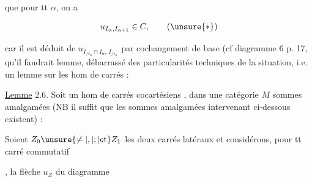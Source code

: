 
que pour tt $\alpha$,  on a

\[
 u_{I_\alpha,I_{\alpha+1}}\in C,\tag*{$(\unsure{*})$}
\]

car il est déduit de $u_{I_{/s_\alpha}\cap I_\alpha,\,I_{/s_\alpha}}$ par cochangement de base (cf diagramme 6 p. 17, qu'il faudrait   lemme, débarrassé des particularités techniques de la situation, i.e. un lemme sur les hom de carrés  :

\uline{Lemme} 2.6. Soit un hom de carrés cocartésiens , dans une catégorie $M$   sommes amalgamées (NB il suffit que les sommes amalgamées intervenant ci-dessous existent) :


Soient $Z_0\unsure{\ne|,|;|\text{et}}Z_1$ les deux carrés latéraux et considérons, pour tt carré commutatif


, la flèche $u_Z$ du diagramme



